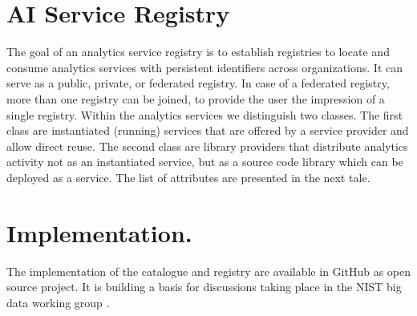 \documentclass[A0,6pt]{article}
\begin{document}
\begin{multicols}{3}
\section*{AI Service Registry} The goal of an analytics service registry is to establish registries to locate and consume analytics services 
with persistent identifiers across organizations.  It can serve as a public, private, or federated registry. In case of a federated registry, more than one registry can be joined, to provide the user the impression of a single registry.
Within the analytics services we distinguish two classes. The first class are instantiated (running) services that are offered by a service provider and allow direct reuse. The second class are library providers that distribute analytics activity not as an instantiated service, but as a source code library which can be deployed as a service. The list of attributes are presented in the next tale.

\section*{Implementation.}

The implementation of the catalogue and registry are available in GitHub as open source project. It is building a basis for discussions taking place in the
NIST big data working group \cite{github-cloudmesh-catalogue}.


\end{multicols}
\end{document}
